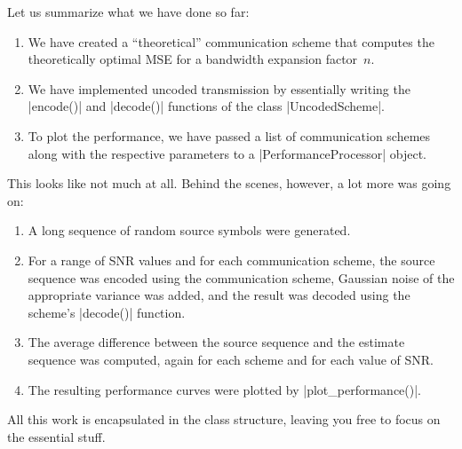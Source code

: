 Let us summarize what we have done so far:
\begin{enumerate}
  \item We have created a ``theoretical'' communication scheme that computes the
    theoretically optimal MSE for a bandwidth expansion factor~$n$.

  \item We have implemented uncoded transmission by essentially writing the
    |encode()| and |decode()| functions of the class |UncodedScheme|.

  \item To plot the performance, we have passed a list of communication schemes
    along with the respective parameters to a |PerformanceProcessor| object.
\end{enumerate}
This looks like not much at all. Behind the scenes, however, a lot more was
going on:
\begin{enumerate}
  \item A long sequence of random source symbols were generated.
  \item For a range of SNR values and for each communication scheme, the source
    sequence was encoded using the communication scheme, Gaussian noise of the
    appropriate variance was added, and the result was decoded using the
    scheme's |decode()| function.
  \item The average difference between the source sequence and the estimate
    sequence was computed, again for each scheme and for each value of SNR. 
  \item The resulting performance curves were plotted by |plot_performance()|.
\end{enumerate}
All this work is encapsulated in the class structure, leaving you free to focus
on the essential stuff.


